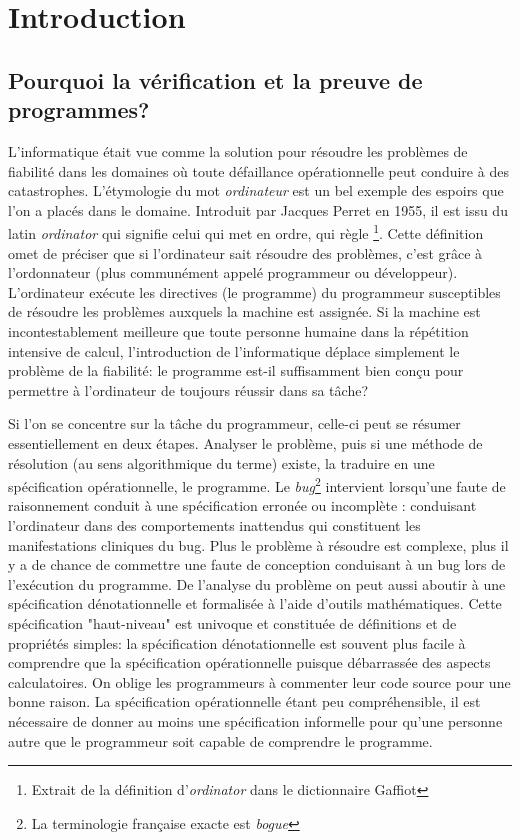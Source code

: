 \chapter{Introduction}

\section{Pourquoi la vérification et la preuve de programmes?}

L'informatique était vue comme la solution pour résoudre les problèmes de
fiabilité dans les domaines où toute défaillance 
opérationnelle peut conduire à des catastrophes. L'étymologie du mot {\em ordinateur}
est un bel exemple des espoirs que l'on a placés dans le domaine. Introduit par Jacques Perret
en 1955, il est issu du latin {\em ordinator} qui signifie celui qui met en ordre, qui règle
\footnote{\footnotesize Extrait de la définition d'{\em ordinator} dans le dictionnaire Gaffiot}.
Cette définition omet de préciser que si l'ordinateur sait résoudre des problèmes, c'est 
grâce à l'ordonnateur (plus communément appelé programmeur ou développeur). %
L'ordinateur exécute les directives (le programme) du programmeur susceptibles de résoudre
les problèmes auxquels la machine est assignée. 
Si la machine est incontestablement meilleure que toute personne humaine dans la répétition 
intensive de calcul, l'introduction de l'informatique déplace simplement le problème 
de la fiabilité: le programme est-il suffisamment bien conçu pour permettre à l'ordinateur
de toujours réussir dans sa tâche? 

Si l'on se concentre sur la tâche du programmeur, celle-ci peut se résumer essentiellement
en deux étapes. Analyser le problème, puis si une méthode de résolution (au sens algorithmique du terme) existe,
la traduire en une spécification opérationnelle, le programme. Le {\em bug}\footnote{\footnotesize
  La terminologie française exacte est {\em bogue}} intervient lorsqu'une faute 
de raisonnement conduit à une spécification erronée ou incomplète : conduisant l'ordinateur 
dans des comportements inattendus qui constituent les manifestations cliniques du bug.
Plus le problème à résoudre est complexe, plus il y a de chance de commettre une faute 
de conception conduisant à un bug lors de l'exécution du programme. 
De l'analyse du problème on peut aussi aboutir à une spécification dénotationnelle et formalisée à l'aide d'outils mathématiques.
Cette spécification "haut-niveau" est univoque et constituée de définitions et de propriétés simples:
la spécification dénotationnelle est souvent plus facile à comprendre que la spécification opérationnelle puisque 
débarrassée des aspects calculatoires.
On oblige les programmeurs à commenter leur code source pour une bonne raison. La spécification opérationnelle
étant peu compréhensible, il est nécessaire de donner au moins une spécification informelle pour qu'une personne autre
que le programmeur soit capable de comprendre le programme.


